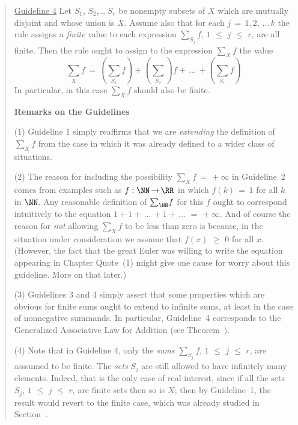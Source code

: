 \begin{quotation}
{\V

        \underline{Guideline 4} Let $S_{1}$, $S_{2}$,\,{\ldots}\,$S_{r}$ be nonempty subsets of $X$ which are mutually disjoint and whose union is $X$.
    Assume also that for each $j \,=\, 1,2,\,{\ldots}\,k$ the rule assigns a {\em finite} value to each expression ${\sum}_{S_{j}} f$, $1\,\,{\leq}\,\,j\,\,{\leq}\,\,r$, are all finite.
    Then the rule ought to assign to the expression ${\sum}_{X} f$ the value
        \begin{displaymath}
        {\sum}_{X} f \,=\, \left({\sum}_{S_{1}} f\right) + \left({\sum}_{S_{2}}\right) f + \,{\ldots}\, + \left({\sum}_{S_{r}} f\right)
        \end{displaymath}
    In particular, in this case ${\sum}_{X} f$ should also be finite.

\V

        {\bf Remarks on the Guidelines}

\V

        (1) Guideline 1 simply reaffirms that we are {\em extending} the definition of ${\sum}_{X} f$ from the case in which it was already defined to a wider class of situations.

        (2) The reason for including the possibility ${\sum}_{X} f \,=\, +{\infty}$ in Guideline~2 comes from examples such as $f:{\NN} \,{\rightarrow}\, {\RR}$ in which $f(k) \,=\, 1$ for all $k$ in ${\NN}$.
    Any reasonable definition of ${\sum}_{{\NN}} f$ for this $f$ ought to correspond intuitively to the equation $1+1+\,{\ldots}\,+1+\,{\ldots}\, \,=\, +{\infty}$.
    And of course the reason for {\em not} allowing ${\sum}_{X} f$ to be less than zero is because, in the situation under consideration we assume that $f(x)\,\,{\geq}\,\,0$ for all $x$.
    (However, the fact that the great Euler was willing to write the equation appearing in Chapter Quote~(1) might give one cause for worry about this guideline.
    More on that later.)

        (3) Guidelines 3 and 4 simply assert that some properties which are obvious for finite sums ought to extend to infinite sums,
    at least in the case of nonnegative summands.
    In particular, Guideline~4 corresponds to the Generalized Associative Law for Addition (see Theorem~).

        (4) Note that in Guideline 4, only the {\em sums} ${\sum}_{S_{j}} f$, $1\,\,{\leq}\,\,j\,\,{\leq}\,\,r$, are asssumed to be finite.
    The {\em sets} $S_{j}$ are still allowed to have infinitely many elements.
    Indeed, that is the only case of real interest, since if all the sets $S_{j}$, $1\,\,{\leq}\,\,j\,\,{\leq}\,\,r$, are finite sets then so is $X$;
    then by Guideline~1, the result would revert to the finite case, which was already studied in Section~.

}
\end{quotation}

